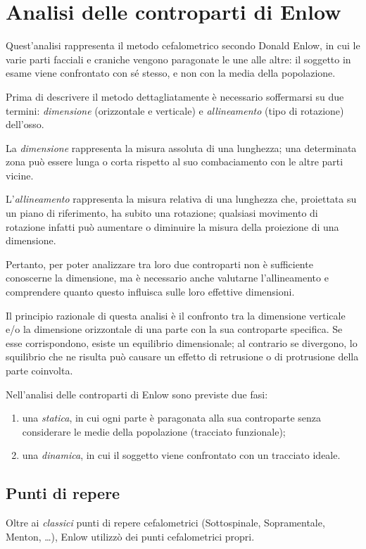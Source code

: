 \chapter{Analisi delle controparti di Enlow}
Quest'analisi rappresenta il metodo cefalometrico secondo Donald Enlow, in cui le varie parti facciali e craniche vengono paragonate le une alle altre: il soggetto in esame viene confrontato con sé stesso, e non con la media della popolazione.

Prima di descrivere il metodo dettagliatamente è necessario soffermarsi su due termini: \emph{dimensione} (orizzontale e verticale) e \emph{allineamento} (tipo di rotazione) dell'osso.

La \emph{dimensione} rappresenta la misura assoluta di una lunghezza; una determinata zona può essere lunga o corta rispetto al suo combaciamento con le altre parti vicine.

L'\emph{allineamento} rappresenta la misura relativa di una lunghezza che, proiettata su un piano di riferimento, ha subito una rotazione; qualsiasi movimento di rotazione infatti può aumentare o diminuire la misura della proiezione di una dimensione.

Pertanto, per poter analizzare tra loro due controparti non è sufficiente conoscerne la dimensione, ma è necessario anche valutarne l'allineamento e comprendere quanto questo influisca sulle loro effettive dimensioni.

Il principio razionale di questa analisi è il confronto tra la dimensione verticale e/o la dimensione orizzontale di una parte con la sua controparte specifica. Se esse corrispondono, esiste un equilibrio dimensionale; al contrario se divergono, lo squilibrio che ne risulta può causare un effetto di retrusione o di protrusione della parte coinvolta.

Nell'analisi delle controparti di Enlow sono previste due fasi:
\begin{enumerate}
\item una \emph{statica}, in cui ogni parte è paragonata alla sua controparte senza considerare le medie della popolazione (tracciato funzionale);
\item una \emph{dinamica}, in cui il soggetto viene confrontato con un tracciato ideale.
\end{enumerate}

\section{Punti di repere}
Oltre ai \textit{classici} punti di repere cefalometrici (Sottospinale, Sopramentale, Menton, \ldots{}), Enlow utilizzò dei punti cefalometrici propri.
